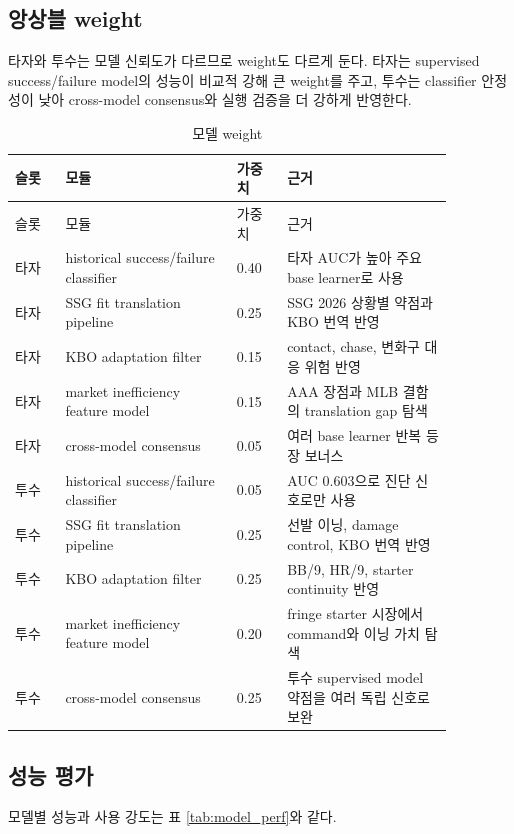 \documentclass[11pt,a4paper]{article}
\begin{document}
\subsection{앙상블 weight}
타자와 투수는 모델 신뢰도가 다르므로 weight도 다르게 둔다. 타자는 supervised success/failure model의 성능이 비교적 강해 큰 weight를 주고, 투수는 classifier 안정성이 낮아 cross-model consensus와 실행 검증을 더 강하게 반영한다.

\begin{longtable}{L{0.10\linewidth}L{0.34\linewidth}C{0.10\linewidth}L{0.33\linewidth}}
\caption{모델 weight}
\label{tab:model_weights}\\
\toprule
슬롯 & 모듈 & 가중치 & 근거 \\
\midrule
\endfirsthead
\toprule
슬롯 & 모듈 & 가중치 & 근거 \\
\midrule
\endhead
타자 & historical success/failure classifier & 0.40 & 타자 AUC가 높아 주요 base learner로 사용 \\
타자 & SSG fit translation pipeline & 0.25 & SSG 2026 상황별 약점과 KBO 번역 반영 \\
타자 & KBO adaptation filter & 0.15 & contact, chase, 변화구 대응 위험 반영 \\
타자 & market inefficiency feature model & 0.15 & AAA 장점과 MLB 결함의 translation gap 탐색 \\
타자 & cross-model consensus & 0.05 & 여러 base learner 반복 등장 보너스 \\
투수 & historical success/failure classifier & 0.05 & AUC 0.603으로 진단 신호로만 사용 \\
투수 & SSG fit translation pipeline & 0.25 & 선발 이닝, damage control, KBO 번역 반영 \\
투수 & KBO adaptation filter & 0.25 & BB/9, HR/9, starter continuity 반영 \\
투수 & market inefficiency feature model & 0.20 & fringe starter 시장에서 command와 이닝 가치 탐색 \\
투수 & cross-model consensus & 0.25 & 투수 supervised model 약점을 여러 독립 신호로 보완 \\
\bottomrule
\end{longtable}

\subsection{성능 평가}
모델별 성능과 사용 강도는 표 \ref{tab:model_perf}와 같다.
\end{document}
